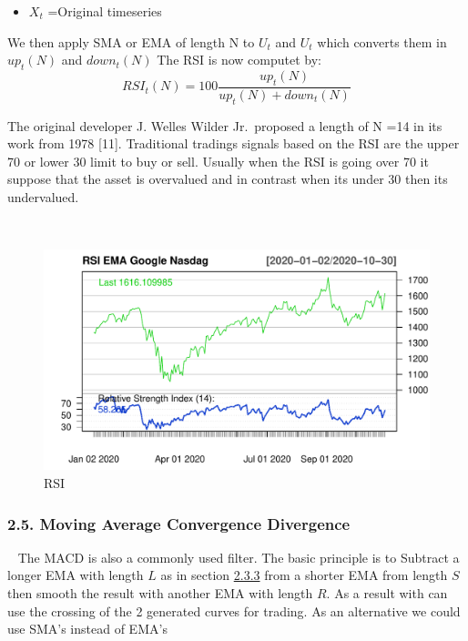 \documentclass[
]{article}
\providecommand{\tightlist}{%
  \setlength{\itemsep}{0pt}\setlength{\parskip}{0pt}}
\begin{document}
\begin{itemize}
\tightlist
\item
  \({X_t}\) =Original timeseries
\end{itemize}

We then apply SMA or EMA of length N to \(U_t\) and \(U_t\) which
converts them in \(up_t(N)\) and \(down_t(N)\) The RSI is now computet
by: \begin{equation}
  \label{eq:mac2}
 RSI_t(N)=100\frac{up_t(N)}{up_t(N)+down_t(N)}
\end{equation}

The original developer J. Welles Wilder Jr.~proposed a length of N =14
in its work from 1978 {[}11{]}. Traditional tradings signals based on
the RSI are the upper 70 or lower 30 limit to buy or sell. Usually when
the RSI is going over 70 it suppose that the asset is overvalued and in
contrast when its under 30 then its undervalued.

~

\begin{figure}

{\centering \includegraphics[width=0.7\linewidth]{00_main_files/figure-latex/chap2.4 -1} 

}

\caption{RSI}\label{fig:chap2.4 }
\end{figure}
\newpage

\hypertarget{moving-average-convergence-divergence}{%
\subsubsection{2.5. Moving Average Convergence
Divergence}\label{moving-average-convergence-divergence}}

~ The MACD is also a commonly used filter. The basic principle is to
Subtract a longer EMA with length \(L\) as in section
\protect\hyperlink{EMA}{2.3.3} from a shorter EMA from length \(S\) then
smooth the result with another EMA with length \(R\). As a result with
can use the crossing of the 2 generated curves for trading. As an
alternative we could use SMA's instead of EMA's
\end{document}
